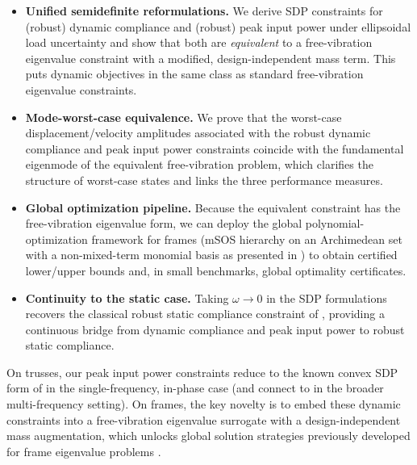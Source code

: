 \documentclass[preprint,3p]{elsarticle}
\numberwithin{equation}{section}
\begin{document}
\begin{itemize}
  \item \textbf{Unified semidefinite reformulations.} We derive SDP constraints for (robust) dynamic compliance and (robust) peak input power under ellipsoidal load uncertainty and show that both are \emph{equivalent} to a free-vibration eigenvalue constraint with a modified, design-independent mass term. This puts dynamic objectives in the same class as standard free-vibration eigenvalue constraints.
  \item \textbf{Mode-worst-case equivalence.} We prove that the worst-case displacement/velocity amplitudes associated with the robust dynamic compliance and peak input power constraints coincide with the fundamental eigenmode of the equivalent free-vibration problem, which clarifies the structure of worst-case states and links the three performance measures.
  \item \textbf{Global optimization pipeline.} Because the equivalent constraint has the free-vibration eigenvalue form, we can deploy the global polynomial-optimization framework for frames (mSOS hierarchy on an Archimedean set with a non-mixed-term monomial basis as presented in \citep{Tyburec2024global}) to obtain certified lower/upper bounds and, in small benchmarks, global optimality certificates.
  \item \textbf{Continuity to the static case.} Taking $\omega\to 0$ in the SDP formulations recovers the classical robust static compliance constraint of \citet{BenTal1997}, providing a continuous bridge from dynamic compliance and peak input power to robust static compliance.
\end{itemize}

On trusses, our peak input power constraints reduce to the known convex SDP form of \citet{Heidari2009optimization} in the single-frequency, in-phase case (and connect to \citet{Ma2025} in the broader multi-frequency setting). On frames, the key novelty is to embed these dynamic constraints into a free-vibration eigenvalue surrogate with a design-independent mass augmentation, which unlocks global solution strategies previously developed for frame eigenvalue problems \citep{Tyburec2024global}.
\end{document}
